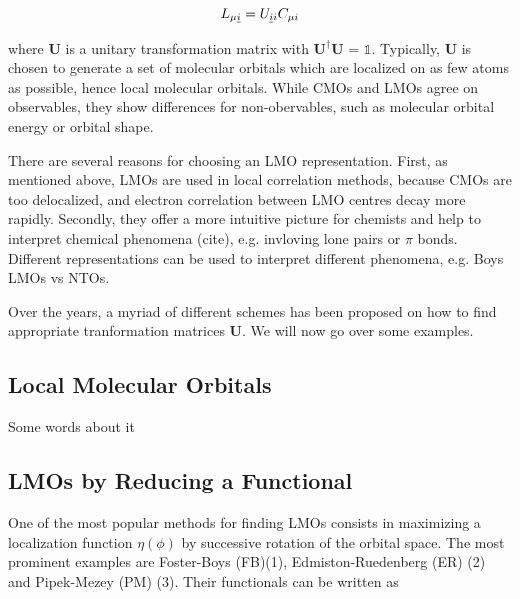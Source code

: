 \begin{equation}
L_{\mu \underline{i}} = U_{\underline{i} i} C_{\mu i}
\end{equation}

\noindent where $\mathbf{U}$ is a unitary transformation matrix with $\mathbf{U}^{\dagger} \mathbf{U}$ = $\mathbb{1}$. Typically, $\mathbf{U}$ is chosen to generate a set of molecular orbitals which are localized on as few atoms as possible, hence local molecular orbitals. While CMOs and LMOs agree on observables, they show differences for non-obervables, such as molecular orbital energy or orbital shape.

There are several reasons for choosing an LMO representation. First, as mentioned above, LMOs are used in local correlation methods, because CMOs are too delocalized, and electron correlation between LMO centres decay more rapidly. Secondly, they offer a more intuitive picture for chemists and help to interpret chemical phenomena (cite), e.g. invloving lone pairs or $\pi$ bonds. Different representations can be used to interpret different phenomena, e.g. Boys LMOs vs NTOs.

Over the years, a myriad of different schemes has been proposed on how to find appropriate tranformation matrices $\mathbf{U}$. We will now go over some examples.

\subsection{Local Molecular Orbitals}

Some words about it

\subsection{LMOs by Reducing a Functional}

One of the most popular methods for finding LMOs consists in maximizing a localization function $\eta(\phi)$ by successive rotation of the orbital space. The most prominent examples are Foster-Boys (FB)(1), Edmiston-Ruedenberg (ER) (2) and Pipek-Mezey (PM) (3). Their functionals can be written as


